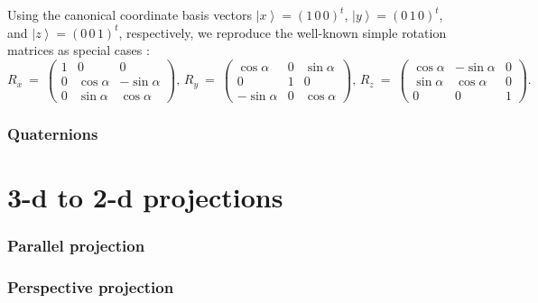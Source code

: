 Using the canonical coordinate basis vectors $\left| x \right> = \left( 1\,0\,0 \right)^t$, $\left| y \right> = \left( 0\,1\,0 \right)^t$,
and $\left| z \right> = \left( 0\,0\,1 \right)^t$, respectively, we reproduce the well-known simple rotation matrices as 
special cases \cite{TODO}:
\begin{equation}
	R_x \ =\ 
		\left( \begin{array}{ccc} 
			1 &                0 &                 0  \\
			0 & \cos \alpha & -\sin \alpha  \\
			0 & \sin \alpha  &  \cos \alpha
		\end{array} \right),\,
	R_y \ =\ 
		\left( \begin{array}{ccc} 
			 \cos \alpha &         0 &   \sin \alpha \\
			               0  &         1 &                  0 \\
			-\sin \alpha  &         0 &  \cos \alpha
		\end{array} \right),\,
	R_z \ =\ 
		\left( \begin{array}{ccc} 
			\cos \alpha & -\sin \alpha &                 0  \\
			\sin \alpha  & \cos \alpha &                 0  \\
			               0 &                 0 &                 1  
		\end{array} \right).
\end{equation}


\subsubsection{Quaternions}


\section{3-d to 2-d projections}

\subsubsection{Parallel projection}

\subsubsection{Perspective projection}

